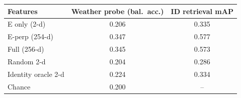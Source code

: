 \begin{tabular}{lcc}
\toprule
Features & Weather probe (bal.\ acc.) & ID retrieval mAP \\
\midrule
E only (2-d) & 0.206 & 0.335 \\
E-perp (254-d) & 0.347 & 0.577 \\
Full (256-d) & 0.345 & 0.573 \\
Random 2-d & 0.204 & 0.286 \\
Identity oracle 2-d & 0.224 & 0.334 \\
\midrule
Chance & 0.200 & -- \\
\bottomrule
\end{tabular}
